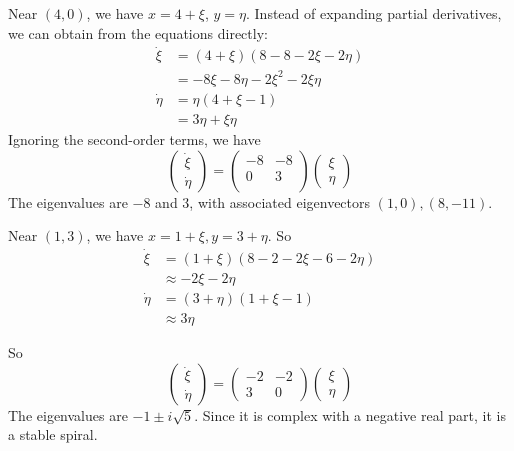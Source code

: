 \documentclass[a4paper]{article}
\begin{document}
\begin{eg}
      Near $(4, 0)$, we have $x = 4 + \xi$, $y = \eta$. Instead of expanding partial derivatives, we can obtain from the equations directly:
      \begin{align*}
        \dot\xi &= (4 + \xi)(8 - 8 - 2\xi - 2\eta)\\
        &= - 8\xi - 8\eta -2\xi^2 - 2\xi\eta\\
        \dot\eta &= \eta(4 + \xi - 1)\\
        &= 3\eta + \xi\eta
      \end{align*}
      Ignoring the second-order terms, we have
      \[
        \begin{pmatrix}
          \dot\xi\\\dot\eta
        \end{pmatrix} = 
        \begin{pmatrix}
          -8 & -8 \\
          0 & 3\\
        \end{pmatrix}
        \begin{pmatrix}
          \xi\\\eta
        \end{pmatrix}
      \]
      The eigenvalues are $-8$ and $3$, with associated eigenvectors $(1, 0), (8, -11)$.

      \begin{center}
      \end{center}

      Near $(1, 3)$, we have $x = 1 + \xi, y = 3 + \eta$. So
      \begin{align*}
        \dot \xi &= (1 + \xi)(8 - 2 - 2\xi - 6 - 2\eta)\\
        &\approx -2\xi - 2\eta\\
        \dot\eta &= (3 + \eta)(1 + \xi - 1)\\
        &\approx 3\eta
      \end{align*}

      So
      \[
        \begin{pmatrix}
          \dot\xi\\\dot\eta
        \end{pmatrix} = 
        \begin{pmatrix}
          -2 & -2\\
          3 & 0
        \end{pmatrix}
        \begin{pmatrix}
          \xi\\\eta
        \end{pmatrix}
      \]
      The eigenvalues are $- 1\pm i\sqrt{5}$. Since it is complex with a negative real part, it is a stable spiral.


\end{eg}
\end{document}
